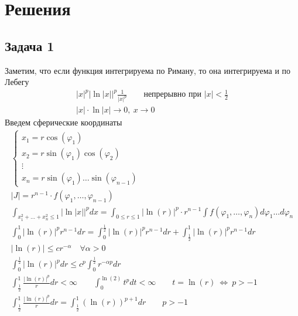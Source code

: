 
\newpage
\section*{Решения}
\subsection*{Задача 1}
	Заметим, что если функция интегрируема по Риману, то она интегрируема и по Лебегу
	\begin{gather*}
	|x|^{p} |\ln|x||^{p} \frac{1}{|x|^{p}}\qquad \text{непрерывно при } |x| < \frac{1}{2}\\
	|x| \cdot \ln|x| \to 0,\ x\to 0
	\end{gather*}
	Введем сферические координаты
	\begin{gather*}
	\begin{cases}
		 x_1 = r \cos(\varphi_1)\\
		 x_2 = r \sin(\varphi_1) \cos(\varphi_2)\\
		 \vdots\\
		 x_n = r \sin(\varphi_1) \ldots \sin(\varphi_{n-1})
	\end{cases}\\
	|J| = r^{n-1} \cdot f(\varphi_1,\ldots, \varphi_{n-1})\\
	\int_{x_1^2 + \ldots + x_n^2 \leqslant 1} |\ln|x||^p dx = \int_{0 \leqslant r \leqslant 1} |\ln(r)|^p \cdot r^{n-1} \int f(\varphi_1, \ldots, \varphi_{n}) d \varphi_1 \ldots d\varphi_{n}\\
	\int_{0}^{1}|\ln(r)|^p r^{n-1} dr = 
	\int_{0}^{\frac{1}{2}} |\ln(r)|^p r^{n-1} dr + \int_{\frac{1}{2}}^{1}|\ln(r)|^p r^{n-1} dr\\
	|\ln(r)| \leqslant c r^{-\alpha}\quad \forall \alpha > 0\\
	\int_{0}^{\frac{1}{2}}|\ln(r)|^p dr \leqslant c^p \int_{0}^{\frac{1}{2}} r^{-\alpha p} dr\\
	\int_{\frac{1}{2}}^{1} \frac{|\ln(r)|^p}{r} dr < \infty\qquad \int_{0}^{\ln(2)} t^p dt < \infty\qquad t = \ln(r)\ \Leftrightarrow\ p > -1\\
	\int_{\frac{1}{2}}^{1} \frac{|\ln(r)|^p}{r} dr = \int_{\frac{1}{2}}^{1} (\ln(r))^{p+1} dr\qquad p > -1
	\end{gather*}
\vskip 0.4in


